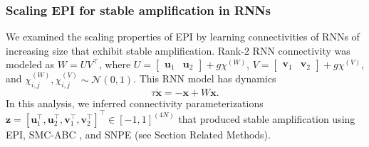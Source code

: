 \documentclass[11pt]{article}
\begin{document}
\subsubsection{Scaling EPI for stable amplification in RNNs}\label{methods_RNN}
We examined the scaling properties of EPI by learning connectivities of RNNs of increasing size that exhibit stable amplification.
Rank-2 RNN connectivity was modeled as $W = UV^\top$, where $U = \begin{bmatrix} \mathbf{u}_1 & \mathbf{u}_2 \end{bmatrix} + g \chi^{(W)}$, $V = \begin{bmatrix} \mathbf{v}_1 & \mathbf{v}_2 \end{bmatrix} + g\chi^{(V)}$, and $\chi^{(W)}_{i,j}, \chi^{(V)}_{i,j} \sim \mathcal{N}(0, 1)$.
This RNN model has dynamics
\begin{equation}
\tau \dot{\mathbf{x}} = -\mathbf{x} + W\mathbf{x}.
\end{equation}
In this analysis, we inferred connectivity parameterizations $\mathbf{z} = \left[\mathbf{u}_1^\top, \mathbf{u}_2^\top, \mathbf{v}_1^\top, \mathbf{v}_2^\top \right]^\top \in \left[-1, 1 \right]^{(4N)}$   that produced stable amplification using EPI, SMC-ABC \cite{sisson2007sequential}, and SNPE \cite{gonccalves2019training} (see Section Related Methods).
\end{document}
